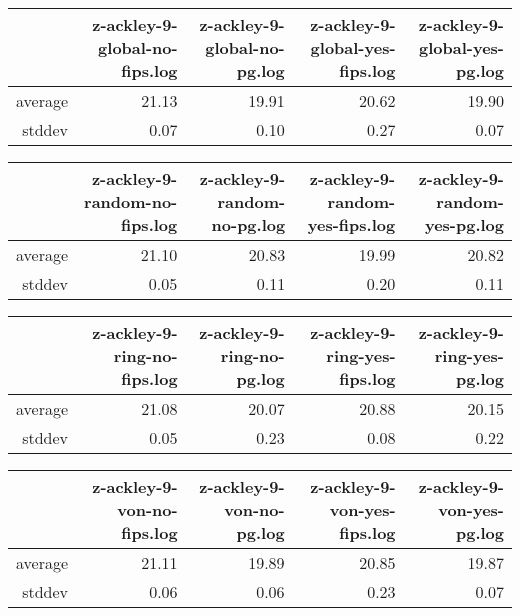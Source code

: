 \begin{table}[ht]
\centering
\begin{tabular}{rrrrr}
  \hline
 & z-ackley-9-global-no-fips.log & z-ackley-9-global-no-pg.log & z-ackley-9-global-yes-fips.log & z-ackley-9-global-yes-pg.log \\ 
  \hline
average & 21.13 & 19.91 & 20.62 & 19.90 \\ 
  stddev & 0.07 & 0.10 & 0.27 & 0.07 \\ 
   \hline
\end{tabular}
\end{table}
\begin{table}[ht]
\centering
\begin{tabular}{rrrrr}
  \hline
 & z-ackley-9-random-no-fips.log & z-ackley-9-random-no-pg.log & z-ackley-9-random-yes-fips.log & z-ackley-9-random-yes-pg.log \\ 
  \hline
average & 21.10 & 20.83 & 19.99 & 20.82 \\ 
  stddev & 0.05 & 0.11 & 0.20 & 0.11 \\ 
   \hline
\end{tabular}
\end{table}
\begin{table}[ht]
\centering
\begin{tabular}{rrrrr}
  \hline
 & z-ackley-9-ring-no-fips.log & z-ackley-9-ring-no-pg.log & z-ackley-9-ring-yes-fips.log & z-ackley-9-ring-yes-pg.log \\ 
  \hline
average & 21.08 & 20.07 & 20.88 & 20.15 \\ 
  stddev & 0.05 & 0.23 & 0.08 & 0.22 \\ 
   \hline
\end{tabular}
\end{table}
\begin{table}[ht]
\centering
\begin{tabular}{rrrrr}
  \hline
 & z-ackley-9-von-no-fips.log & z-ackley-9-von-no-pg.log & z-ackley-9-von-yes-fips.log & z-ackley-9-von-yes-pg.log \\ 
  \hline
average & 21.11 & 19.89 & 20.85 & 19.87 \\ 
  stddev & 0.06 & 0.06 & 0.23 & 0.07 \\ 
   \hline
\end{tabular}
\end{table}
